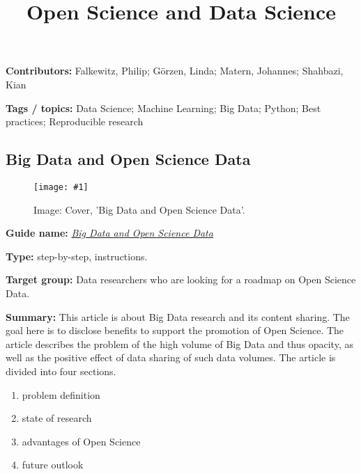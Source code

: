 \documentclass{article}
\newlength{\imgwidth}
\newcommand\scaledgraphics[2]{%
                
\settowidth{\imgwidth}{\texttt{[image: \#1]}}%
                
\setlength{\imgwidth}{\minof{\imgwidth}{#2\textwidth}}%
                
\texttt{[image: \#1]}%
                
}
\begin{document}
\title{Open Science and Data Science}

\maketitle


\textbf{Contributors:} Falkewitz, Philip;  Görzen, Linda; Matern, Johannes;  Shahbazi, Kian 


\textbf{Tags / topics:} Data Science; Machine Learning; Big Data; Python; Best practices; Reproducible research


\subsection{Big Data and Open Science Data}\label{H6205473}



\begin{center}
\begin{figure}
\scaledgraphics{25f071a6-9aec-4c08-bfd3-bfb548adfaee.jpg}{0.5}
\caption*{Image: Cover, 'Big Data and Open Science Data'.}\label{F77040021}
\end{figure}


\end{center}


 \textbf{Guide name:} \emph{\href{https://insidebigdata.com/2015/07/02/big-data-and-open-science-data/}{Big Data and Open Science Data}} \autocite{gutierrez_big_2015}


\textbf{Type:} step-by-step, instructions.


\textbf{Target group:} Data researchers who are looking for a roadmap on Open Science Data.


\textbf{Summary:} This article is about Big Data research and its content sharing. The goal here is to disclose benefits to support the promotion of Open Science. The article describes the problem of the high volume of Big Data and thus opacity, as well as the positive effect of data sharing of such data volumes. The article is divided into four sections.

\begin{enumerate}
\item problem definition


\item state of research


\item advantages of Open Science


\item future outlook


\end{enumerate}
\end{document}
